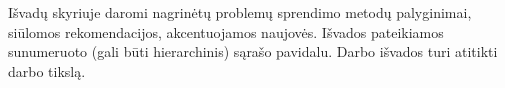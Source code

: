 Išvadų skyriuje daromi nagrinėtų problemų sprendimo metodų palyginimai, siūlomos
rekomendacijos, akcentuojamos naujovės. Išvados pateikiamos sunumeruoto
(gali būti hierarchinis) sąrašo pavidalu. Darbo išvados turi atitikti darbo tikslą.